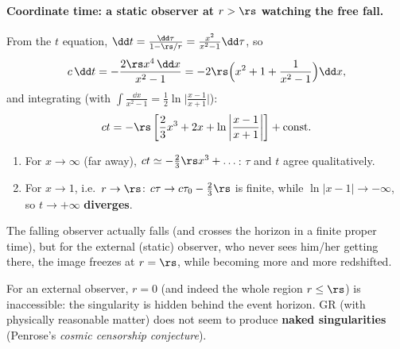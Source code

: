 \paragraph{Coordinate time: a static observer at $r>\rs$ watching the free fall.} From the $t$ equation, $\dd t=\frac{\dd\tau}{1-\rs/r}=\frac{x^2}{x^2-1}\dd\tau$, so
\[
  c\,\dd t=-\frac{2\rs x^4\,\dd x}{x^2-1}=-2\rs\Big(x^2+1+\frac{1}{x^2-1}\Big)\dd x ,
\]
and integrating (with $\int\frac{\dd x}{x^2-1}=\frac12\ln\big|\frac{x-1}{x+1}\big|$):
\begin{equation}
  ct=-\rs\left[\frac23x^3+2x+\ln\left|\frac{x-1}{x+1}\right|\right]+\text{const}.
\end{equation}
\begin{enumerate}[label=(\roman*)]
\item For $x\to\infty$ (far away), $ct\simeq-\frac23\rs x^3+\dots$: $\tau$ and $t$ agree qualitatively.
\item For $x\to1$, i.e.\ $r\to\rs$: $c\tau\to c\tau_0-\frac23\rs$ is finite, while $\ln|x-1|\to-\infty$, so $t\to+\infty$ \textbf{diverges}.
\end{enumerate}
The falling observer actually falls (and crosses the horizon in a finite proper time), but for the external (static) observer, who never sees him/her getting there, the image freezes at $r=\rs$, while becoming more and more redshifted.

\begin{keyresult}
For an external observer, $r=0$ (and indeed the whole region $r\le\rs$) is inaccessible: the singularity is hidden behind the event horizon. GR (with physically reasonable matter) does not seem to produce \textbf{naked singularities} (Penrose's \emph{cosmic censorship conjecture}).
\end{keyresult}
